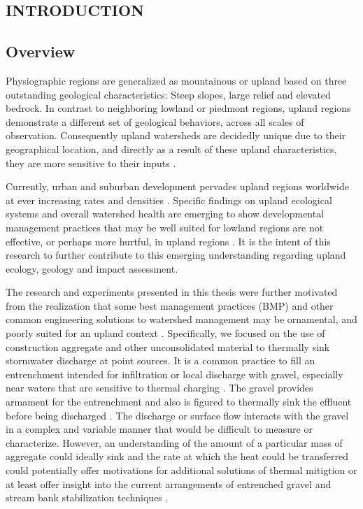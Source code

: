 

\doublespacing
\begin{center}
\section{INTRODUCTION}
\end{center}

\subsection{Overview}
Physiographic regions are generalized as mountainous or upland based on three outstanding geological characteristics: Steep slopes, large relief and elevated bedrock. In contrast to neighboring lowland or piedmont regions, upland regions demonstrate a different set of geological behaviors, across all scales of observation. Consequently upland watersheds are decidedly unique due to their geographical location, and directly as a result of these upland characteristics, they are more sensitive to their inputs \citep{watersheds}.

Currently, urban and suburban development pervades upland regions worldwide at ever increasing rates and densities \citep{rgis}. Specific findings on upland ecological systems and overall watershed health are emerging to show developmental management practices that may be well suited for lowland regions are not effective, or perhaps more hurtful, in upland regions \citep{urban}. It is the intent of this research to further contribute to this emerging understanding regarding upland ecology, geology and impact assessment.

The research and experiments presented in this thesis were further motivated from the realization that some best management practices (BMP) and other common engineering solutions to watershed management may be ornamental, and poorly suited for an upland context \citep{urban}. Specifically, we focused on the use of construction aggregate and other unconsolidated material to thermally sink stormwater discharge at point sources. It is a common practice to fill an entrenchment intended for infiltration or local discharge with gravel, especially near waters that are sensitive to thermal charging \citep{rgis}. The gravel provides armament for the entrenchment and also is figured to thermally sink the effluent before being discharged \citep{ballast}. The discharge or surface flow interacts with the gravel in a complex and variable manner that would be difficult to measure or characterize. However, an understanding of the amount of a particular mass of aggregate could ideally sink and the rate at which the heat could be transferred could potentially offer motivations for additional solutions of thermal mitigtion or at least offer insight into the current arrangements of entrenched gravel and stream bank stabilization techniques \citep{kRocks}.

